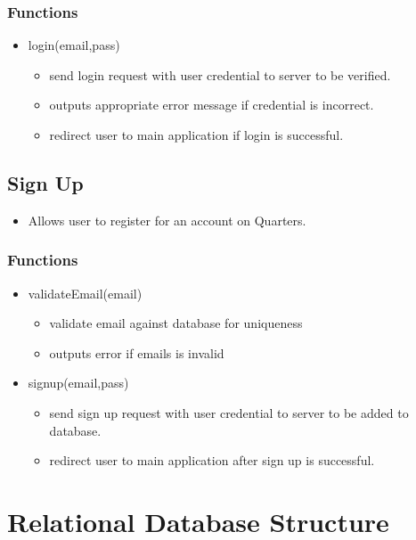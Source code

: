\documentclass[12pt]{article}
\begin{document}
\subsubsection{Functions}
\begin{itemize}
    \item login(email,pass)
    \begin{itemize}
        \item send login request with user credential to server to be verified.
        \item outputs appropriate error message if credential is incorrect.
        \item redirect user to main application if login is successful.
    \end{itemize}
\end{itemize}

\subsection{Sign Up}
\begin{itemize}
    \item Allows user to register for an account on Quarters.
\end{itemize}
\subsubsection{Functions}
\begin{itemize}
    \item validateEmail(email)
    \begin{itemize}
        \item validate email against database for uniqueness
        \item outputs error if emails is invalid
    \end{itemize}
    \item signup(email,pass)
    \begin{itemize}
        \item send sign up request with user credential to server to be added to database.
        \item redirect user to main application after sign up is successful.
    \end{itemize}
\end{itemize}


\section{Relational Database Structure}
\end{document}
